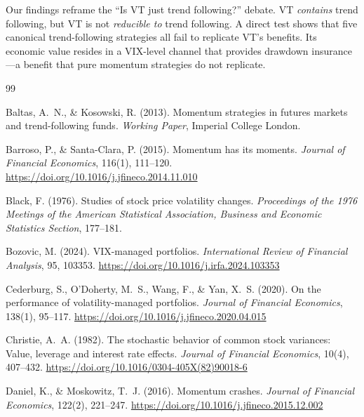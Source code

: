\documentclass[12pt,a4paper]{article}
\begin{document}
Our findings reframe the ``Is VT just trend following?'' debate. VT \textit{contains} trend following, but VT is not \textit{reducible to} trend following. A direct test shows that five canonical trend-following strategies all fail to replicate VT's benefits. Its economic value resides in a VIX-level channel that provides drawdown insurance---a benefit that pure momentum strategies do not replicate.



\begin{thebibliography}{99}

Baltas, A.~N., \& Kosowski, R. (2013). Momentum strategies in futures markets and trend-following funds. \textit{Working Paper}, Imperial College London.

Barroso, P., \& Santa-Clara, P. (2015). Momentum has its moments. \textit{Journal of Financial Economics}, 116(1), 111--120. \url{https://doi.org/10.1016/j.jfineco.2014.11.010}

Black, F. (1976). Studies of stock price volatility changes. \textit{Proceedings of the 1976 Meetings of the American Statistical Association, Business and Economic Statistics Section}, 177--181.

Bozovic, M. (2024). VIX-managed portfolios. \textit{International Review of Financial Analysis}, 95, 103353. \url{https://doi.org/10.1016/j.irfa.2024.103353}

Cederburg, S., O'Doherty, M.~S., Wang, F., \& Yan, X.~S. (2020). On the performance of volatility-managed portfolios. \textit{Journal of Financial Economics}, 138(1), 95--117. \url{https://doi.org/10.1016/j.jfineco.2020.04.015}

Christie, A.~A. (1982). The stochastic behavior of common stock variances: Value, leverage and interest rate effects. \textit{Journal of Financial Economics}, 10(4), 407--432. \url{https://doi.org/10.1016/0304-405X(82)90018-6}

Daniel, K., \& Moskowitz, T.~J. (2016). Momentum crashes. \textit{Journal of Financial Economics}, 122(2), 221--247. \url{https://doi.org/10.1016/j.jfineco.2015.12.002}


\end{thebibliography}
\end{document}
